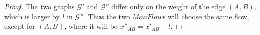 \begin{proof}
   The two graphs $\mathcal{G}'$ and $\mathcal{G}''$ differ only on the weight of the edge $\left(A, B\right)$, which is
   larger by $l$ in $\mathcal{G}''$. Thus the two $MaxFlow$s will choose the same flow, except for $\left(A, B\right)$,
   where it will be $x''_{AB} = x'_{AB} + l$.
\end{proof}

